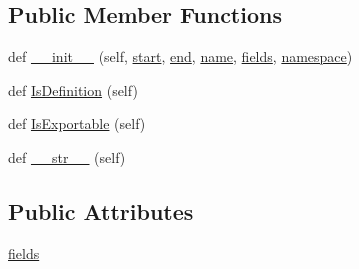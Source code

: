 \subsection*{Public Member Functions}
\begin{DoxyCompactItemize}
\item 
def \mbox{\hyperlink{classgoogletest-master_1_1googlemock_1_1scripts_1_1generator_1_1cpp_1_1ast_1_1___nested_type_af54bc93c59c75d903f1a26258c2fe9d9}{\+\_\+\+\_\+init\+\_\+\+\_\+}} (self, \mbox{\hyperlink{classgoogletest-master_1_1googlemock_1_1scripts_1_1generator_1_1cpp_1_1ast_1_1_node_a6f9eb279a989f9ca27e7d0f1975336d1}{start}}, \mbox{\hyperlink{classgoogletest-master_1_1googlemock_1_1scripts_1_1generator_1_1cpp_1_1ast_1_1_node_a747e90ade89c1764e83b5b649bde18cc}{end}}, \mbox{\hyperlink{classgoogletest-master_1_1googlemock_1_1scripts_1_1generator_1_1cpp_1_1ast_1_1___generic_declaration_a85dc1c6f0115301c310cd3f99416fa86}{name}}, \mbox{\hyperlink{classgoogletest-master_1_1googlemock_1_1scripts_1_1generator_1_1cpp_1_1ast_1_1___nested_type_a5ca114bde3e0c019c39c9727c37a77d9}{fields}}, \mbox{\hyperlink{classgoogletest-master_1_1googlemock_1_1scripts_1_1generator_1_1cpp_1_1ast_1_1___generic_declaration_a285067decd742f4effc0d1bc674bce85}{namespace}})
\item 
def \mbox{\hyperlink{classgoogletest-master_1_1googlemock_1_1scripts_1_1generator_1_1cpp_1_1ast_1_1___nested_type_ab4793fa112920ab7fdf96f1620880d7d}{Is\+Definition}} (self)
\item 
def \mbox{\hyperlink{classgoogletest-master_1_1googlemock_1_1scripts_1_1generator_1_1cpp_1_1ast_1_1___nested_type_a3d7a181db0d658987b9b331949bf028e}{Is\+Exportable}} (self)
\item 
def \mbox{\hyperlink{classgoogletest-master_1_1googlemock_1_1scripts_1_1generator_1_1cpp_1_1ast_1_1___nested_type_ab46d1f423e98d4be311d88c195add32d}{\+\_\+\+\_\+str\+\_\+\+\_\+}} (self)
\end{DoxyCompactItemize}
\subsection*{Public Attributes}
\begin{DoxyCompactItemize}
\item 
\mbox{\hyperlink{classgoogletest-master_1_1googlemock_1_1scripts_1_1generator_1_1cpp_1_1ast_1_1___nested_type_a5ca114bde3e0c019c39c9727c37a77d9}{fields}}
\end{DoxyCompactItemize}


